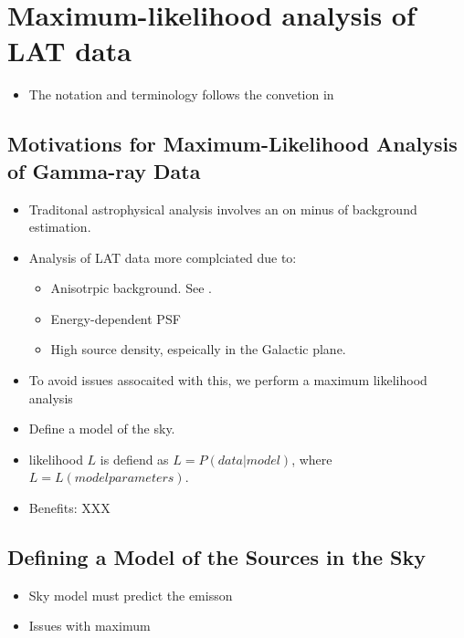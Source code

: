 \chapter{Maximum-likelihood analysis of LAT data}


\begin{itemize}
  \item The notation and terminology follows the convetion in 
\end{itemize}

\section{Motivations for Maximum-Likelihood Analysis of Gamma-ray Data}

\begin{itemize}
  \item Traditonal astrophysical analysis involves an on minus of background estimation.
  \item Analysis of LAT data more complciated due to:
    \begin{itemize}
      \item Anisotrpic background. See .
      \item Energy-dependent PSF
      \item High source density, espeically in the Galactic plane.
    \end{itemize}
  \item To avoid issues assocaited with this, we perform a maximum likelihood analysis
  \item Define a model of the sky.
  \item likelihood $L$ is defiend as $L=P(data|model)$, where $L=L(model parameters)$.
  \item Benefits: XXX
\end{itemize}

\section{Defining a Model of the Sources in the Sky}

\begin{itemize}
  \item Sky model must predict the emisson 
  \item Issues with maximum 
\end{itemize}

